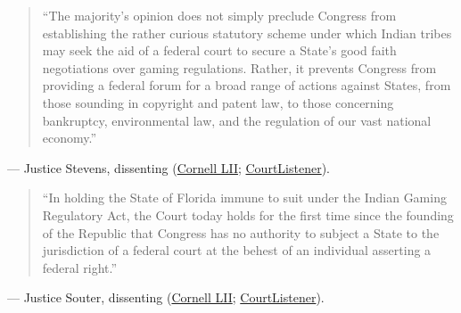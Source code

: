 \documentclass[12pt]{article}
\begin{document}
\begin{quote}
``The majority's opinion does not simply preclude Congress from establishing the rather curious statutory scheme under which Indian tribes may seek the aid of a federal court to secure a State's good faith negotiations over gaming regulations. Rather, it prevents Congress from providing a federal forum for a broad range of actions against States, from those sounding in copyright and patent law, to those concerning bankruptcy, environmental law, and the regulation of our vast national economy.''
\end{quote}
\noindent --- Justice Stevens, dissenting (\href{https://www.law.cornell.edu/supct/html/94-12.ZD.html}{Cornell LII}; \href{https://www.courtlistener.com/opinion/118011/seminole-tribe-of-florida-v-florida/}{CourtListener}).

\begin{quote}
``In holding the State of Florida immune to suit under the Indian Gaming Regulatory Act, the Court today holds for the first time since the founding of the Republic that Congress has no authority to subject a State to the jurisdiction of a federal court at the behest of an individual asserting a federal right.''
\end{quote}
\noindent --- Justice Souter, dissenting (\href{https://www.law.cornell.edu/supct/html/94-12.ZD1.html}{Cornell LII}; \href{https://www.courtlistener.com/opinion/118011/seminole-tribe-of-florida-v-florida/}{CourtListener}).
\end{document}
